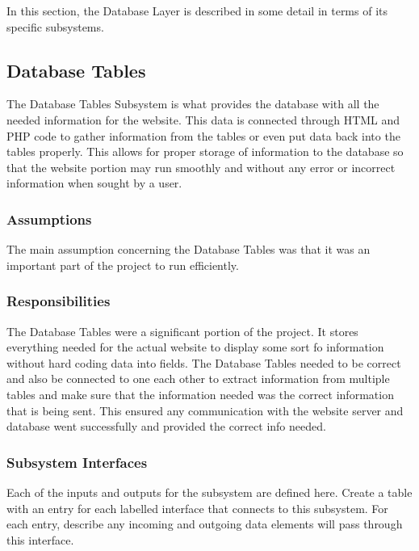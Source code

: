 In this section, the Database Layer is described in some detail in terms of its specific subsystems.

\subsection{Database Tables}
The Database Tables Subsystem is what provides the database with all the needed information for the website. This data is connected through HTML and PHP code to gather information from the tables or even put data back into the tables properly. This allows for proper storage of information to the database so that the website portion may run smoothly and without any error or incorrect information when sought by a user.

\subsubsection{Assumptions}
The main assumption concerning the Database Tables was that it was an important part of the project to run efficiently.

\subsubsection{Responsibilities}
The Database Tables were a significant portion of the project. It stores everything needed for the actual website to display some sort fo information without hard coding data into fields. The Database Tables needed to be correct and also be connected to one each other to extract information from multiple tables and make sure that the information needed was the correct information that is being sent. This ensured any communication with the website server and database went successfully and provided the correct info needed.

\subsubsection{Subsystem Interfaces}
Each of the inputs and outputs for the subsystem are defined here. Create a table with an entry for each labelled interface that connects to this subsystem. For each entry, describe any incoming and outgoing data elements will pass through this interface.

